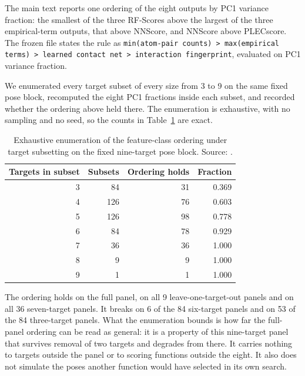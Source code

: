 
The main text reports one ordering of the eight outputs by PC1 variance fraction: the smallest
of the three RF-Scores above the largest of the three empirical-term outputs, that above
NNScore, and NNScore above PLECscore. The frozen file states the rule as
\texttt{min(atom-pair counts) > max(empirical terms) > learned contact net > interaction
fingerprint}, evaluated on PC1 variance fraction.

We enumerated every target subset of every size from 3 to 9 on the same fixed pose block,
recomputed the eight PC1 fractions inside each subset, and recorded whether the ordering above
held there. The enumeration is exhaustive, with no sampling and no seed, so the counts in
Table~\ref{tab:s3subsets} are exact.

\begin{table}[htbp]
\centering
\caption{Exhaustive enumeration of the feature-class ordering under target subsetting on the
fixed nine-target pose block. Source:
\protect{}.}
\label{tab:s3subsets}
\small
\begin{tabular}{rrrr}
\toprule
Targets in subset & Subsets & Ordering holds & Fraction \\
\midrule
3 & 84 & 31 & 0.369 \\
4 & 126 & 76 & 0.603 \\
5 & 126 & 98 & 0.778 \\
6 & 84 & 78 & 0.929 \\
7 & 36 & 36 & 1.000 \\
8 & 9 & 9 & 1.000 \\
9 & 1 & 1 & 1.000 \\
\bottomrule
\end{tabular}
\end{table}

The ordering holds on the full panel, on all 9 leave-one-target-out panels and on all 36
seven-target panels. It breaks on 6 of the 84 six-target panels and on 53 of the 84
three-target panels. What the enumeration bounds is how far the full-panel ordering can be
read as general: it is a property of this nine-target panel that survives removal of two
targets and degrades from there. It carries nothing to targets outside the panel or to scoring
functions outside the eight. It also does not simulate the poses another function would have
selected in its own search.



